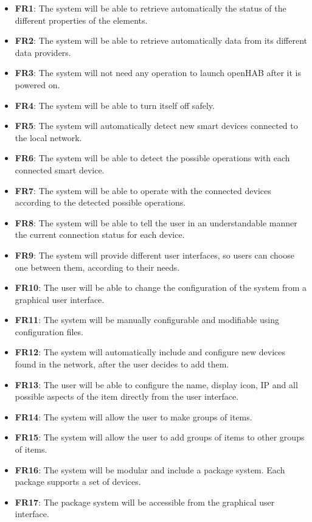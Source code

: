 \begin{itemize}
	\item \textbf{FR1}: The system will be able to retrieve automatically the status of the different properties of the elements.
	\item \textbf{FR2}: The system will be able to retrieve automatically data from its different data providers.
	\item \textbf{FR3}: The system will not need any operation to launch openHAB after it is powered on.
	\item \textbf{FR4}: The system will be able to turn itself off safely.
	\item \textbf{FR5}: The system will automatically detect new smart devices connected to the local network.
	\item \textbf{FR6}: The system will be able to detect the possible operations with each connected smart device. 
	\item \textbf{FR7}: The system will be able to operate with the connected devices according to the detected possible operations.
	\item \textbf{FR8}: The system will be able to tell the user in an understandable manner the current connection status for each
	device.
	\item \textbf{FR9}: The system will provide different user interfaces, so users can choose one between them, according to
	their needs.
	\item \textbf{FR10}: The user will be able to change the configuration of the system from a graphical user interface.
	\item \textbf{FR11}: The system will be manually configurable and modifiable using configuration files.
	\item \textbf{FR12}: The system will automatically include and configure new devices found in the network, after the user decides
	to add them.
	\item \textbf{FR13}: The user will be able to configure the name, display icon, IP and all possible aspects of the item directly from
	the user interface.
	\item \textbf{FR14}: The system will allow the user to make groups of items.
	\item \textbf{FR15}: The system will allow the user to add groups of items to other groups of items.
	\item \textbf{FR16}: The system will be modular and include a package system. Each package supports a set of devices.
	\item \textbf{FR17}: The package system will be accessible from the graphical user interface.

\end{itemize}
